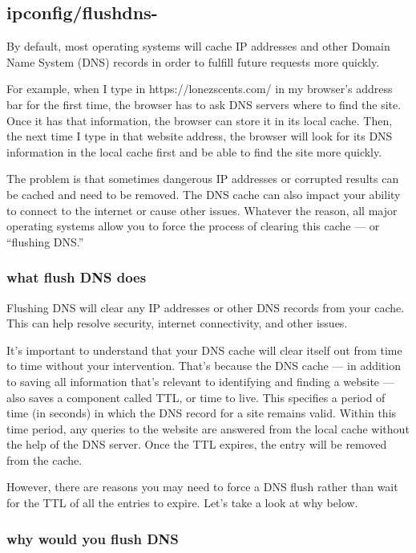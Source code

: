 \documentclass[a4paper,12pt]{article}
\begin{document}
\subsection{ipconfig/flushdns-}

By default, most operating systems will cache IP addresses and other Domain Name System (DNS) records in order to fulfill future requests more quickly.

For example, when I type in https://lonezscents.com/ in my browser’s address bar for the first time, the browser has to ask DNS servers where to find the site. Once it has that information, the browser can store it in its local cache. Then, the next time I type in that website address, the browser will look for its DNS information in the local cache first and be able to find the site more quickly.

The problem is that sometimes dangerous IP addresses or corrupted results can be cached and need to be removed. The DNS cache can also impact your ability to connect to the internet or cause other issues. Whatever the reason, all major operating systems allow you to force the process of clearing this cache — or “flushing DNS.”

\subsubsection{what flush DNS does}
Flushing DNS will clear any IP addresses or other DNS records from your cache. This can help resolve security, internet connectivity, and other issues.

It’s important to understand that your DNS cache will clear itself out from time to time without your intervention. That’s because the DNS cache — in addition to saving all information that’s relevant to identifying and finding a website — also saves a component called TTL, or time to live. This specifies a period of time (in seconds) in which the DNS record for a site remains valid. Within this time period, any queries to the website are answered from the local cache without the help of the DNS server. Once the TTL expires, the entry will be removed from the cache.

However, there are reasons you may need to force a DNS flush rather than wait for the TTL of all the entries to expire. Let’s take a look at why below.

\subsubsection{why would you flush DNS}
\end{document}
